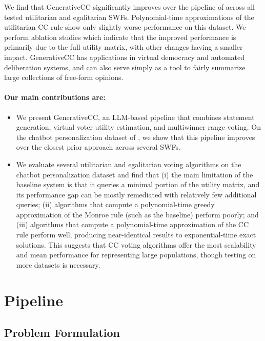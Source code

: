 \documentclass[letterpaper]{article} %
\begin{document}
We find that GenerativeCC significantly improves over the pipeline of \citet{fish-v2} across all tested utilitarian and egalitarian SWFs.
Polynomial-time approximations of the utilitarian CC rule show only slightly worse performance on this dataset.
We perform ablation studies which indicate that the improved performance is primarily due to the full utility matrix, with other changes having a smaller impact.
GenerativeCC has applications in virtual democracy and automated deliberation systems, and can also serve simply as a tool to fairly summarize large collections of free-form opinions.

\paragraph{Our main contributions are:}
\begin{itemize}
    \item We present GenerativeCC, an LLM-based pipeline that combines statement generation, virtual voter utility estimation, and multiwinner range voting.
    On the chatbot personalization dataset of \citet{fish-v2}, we show that this pipeline improves over the closest prior approach across several SWFs.
    \item We evaluate several utilitarian and egalitarian voting algorithms on the chatbot personalization dataset and find that (i) the main limitation of the baseline system is that it queries a minimal portion of the utility matrix, and its performance gap can be mostly remediated with relatively few additional queries; (ii) algorithms that compute a polynomial-time greedy approximation of the Monroe rule (such as the baseline) perform poorly; and (iii) algorithms that compute a polynomial-time approximation of the CC rule perform well, producing near-identical results to exponential-time exact solutions.
    This suggests that \textsc{CC} voting algorithms offer the most scalability and mean performance for representing large populations, though testing on more datasets is necessary.
\end{itemize}

\section{Pipeline}

\subsection{Problem Formulation}
\label{sec:problem-formulation}
\end{document}
